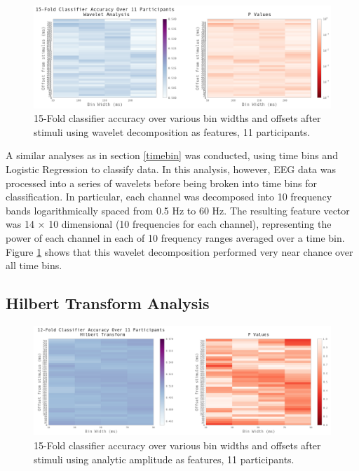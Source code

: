 \documentclass[12pt]{report}
\begin{document}
\begin{figure}[t]
\centerline{
\includegraphics[width=7in]{wavelet_gridsearch.png}
}
\caption{15-Fold classifier accuracy over various bin widths and offsets after stimuli using wavelet decomposition as features, 11 participants.\label{wavelet_gridsearch}}
\end{figure}


	A similar analyses as in section \ref{timebin} was conducted, using time bins and Logistic Regression to classify data.  In this analysis, however, EEG data was processed into a series of wavelets before being broken into time bins for classification.  In particular, each channel was decomposed into 10 frequency bands logarithmically spaced from 0.5 Hz to 60 Hz.  The resulting feature vector was 14 $\times$ 10 dimensional (10 frequencies for each channel), representing the power of each channel in each of 10 frequency ranges averaged over a time bin.  Figure \ref{wavelet_gridsearch} shows that this wavelet decomposition performed very near chance over all time bins.

\subsection{Hilbert Transform Analysis}  

\begin{figure}[t]
\centerline{
\includegraphics[width=7in]{hilbert_gridsearch}
}
\caption{15-Fold classifier accuracy over various bin widths and offsets after stimuli using analytic amplitude as features, 11 participants.\label{hilbert_gridsearch}}
\end{figure}
\end{document}
